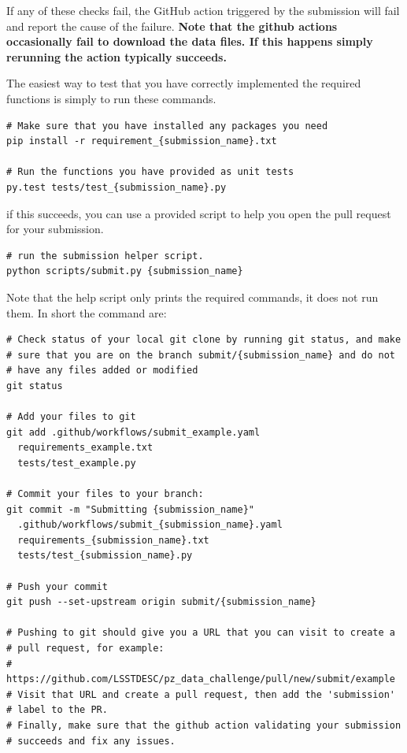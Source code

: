 \documentclass[11pt,twoside,letterpaper,onecolumn,english]{article}
\begin{document}
If any of these checks fail, the GitHub action triggered by the
submission will fail and report the cause of the failure.  \textbf{Note that
the github actions occasionally fail to download the data files.  If this happens
simply rerunning the action typically succeeds.}

The easiest way to test that you have correctly implemented the
required functions is simply to run these commands.

\begin{verbatim}
# Make sure that you have installed any packages you need
pip install -r requirement_{submission_name}.txt

# Run the functions you have provided as unit tests
py.test tests/test_{submission_name}.py
\end{verbatim}

if this succeeds, you can use a provided script to help you open the
pull request for your submission.

\begin{verbatim}
# run the submission helper script.
python scripts/submit.py {submission_name}
\end{verbatim}

Note that the help script only prints the required commands, it does
not run them.  In short the command are:

\begin{verbatim}
# Check status of your local git clone by running git status, and make
# sure that you are on the branch submit/{submission_name} and do not
# have any files added or modified
git status

# Add your files to git
git add .github/workflows/submit_example.yaml
  requirements_example.txt
  tests/test_example.py

# Commit your files to your branch: 
git commit -m "Submitting {submission_name}"
  .github/workflows/submit_{submission_name}.yaml
  requirements_{submission_name}.txt
  tests/test_{submission_name}.py

# Push your commit
git push --set-upstream origin submit/{submission_name}

# Pushing to git should give you a URL that you can visit to create a
# pull request, for example:
#   https://github.com/LSSTDESC/pz_data_challenge/pull/new/submit/example
# Visit that URL and create a pull request, then add the 'submission'
# label to the PR.
# Finally, make sure that the github action validating your submission
# succeeds and fix any issues.
\end{verbatim}
\end{document}
